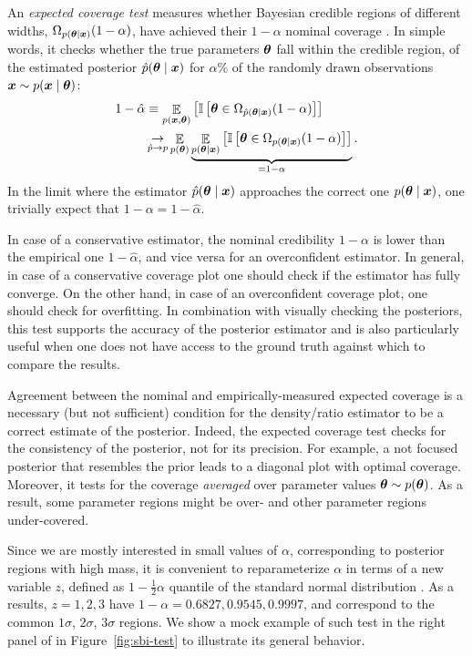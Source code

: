 An \emph{expected coverage test} measures whether Bayesian credible regions of different widths, $\Omega_{p(\bm{\theta} \mid \bm{x})}(1-\alpha)$, have achieved their $1-\alpha$ nominal coverage \cite{Hermans:2021rqv, Cole:2021gwr}. In simple words, it checks whether the true parameters $\bm{\theta}$ fall within the credible region, of the estimated posterior $\hat{p}(\bm{\theta}\mid\bm{x})$ for $\alpha\%$ of the randomly drawn observations $\bm{x} \sim p(\bm{x}\mid\bm{\theta})$:
%
\begin{align}
	1-\hat{\alpha} &\equiv \mathop{\mathbb{E}}\limits_{p(\bm{x}, \bm{\theta})} \left[ \mathbb{I} \left[ \bm{\theta} \in \Omega_{\hat{p}(\bm{\theta} \mid \bm{x})}(1-\alpha) \right] \right] \\
		& \mathop{\rightarrow}\limits_{\hat{p} \rightarrow p}  \mathop{\mathbb{E}}\limits_{p(\bm{\theta})} \underbrace{\mathop{\mathbb{E}}\limits_{p(\bm{\theta}\mid\bm{x})} \left[ \mathbb{I} \left[ \bm{\theta} \in \Omega_{p(\bm{\theta} \mid \bm{x})}(1-\alpha) \right] \right]}_{ = 1-\alpha}.
\end{align}
%
In the limit where the estimator $\hat{p}(\bm{\theta}\mid\bm{x})$ approaches the correct one ${p}(\bm{\theta}\mid\bm{x})$, one trivially expect that $1-\alpha=1-\hat{\alpha}$. 

In case of a conservative estimator, the nominal credibility $1-\alpha$ is lower than the empirical one $1-\hat\alpha$, and vice versa for an overconfident estimator. In general, in case of a conservative coverage plot one should check if the estimator has fully converge. On the other hand, in case of an overconfident coverage plot, one should check for overfitting. In combination with visually checking the posteriors, this test supports the accuracy of the posterior estimator and is also particularly useful when one does not have access to the ground truth against which to compare the results. 

Agreement between the nominal and empirically-measured expected coverage is a necessary (but not sufficient) condition for the density/ratio estimator to be a correct estimate of the posterior. Indeed, the expected coverage test checks for the consistency of the posterior, not for its precision. For example, a not focused posterior that resembles the prior leads to a diagonal plot with optimal coverage. Moreover, it tests for the coverage \emph{averaged} over parameter values $\bm{\theta} \sim p(\bm{\theta})$. As a result, some parameter regions might be over- and other parameter regions under-covered.

Since we are mostly interested in small values of $\alpha$, corresponding to posterior regions with high mass, it is convenient to reparameterize $\alpha$ in terms of a new variable $z$, defined as $1-\frac12 \alpha$ quantile of the standard normal distribution \cite{Cole:2021gwr}. As a results,  $z = 1, 2, 3$ have $1-\alpha = 0.6827, 0.9545, 0.9997$, and correspond to the common $1\sigma$, $2\sigma$, $3\sigma$ regions. We show a mock example of such test in the right panel of in Figure~\ref{fig:sbi-test} to illustrate its general behavior.


